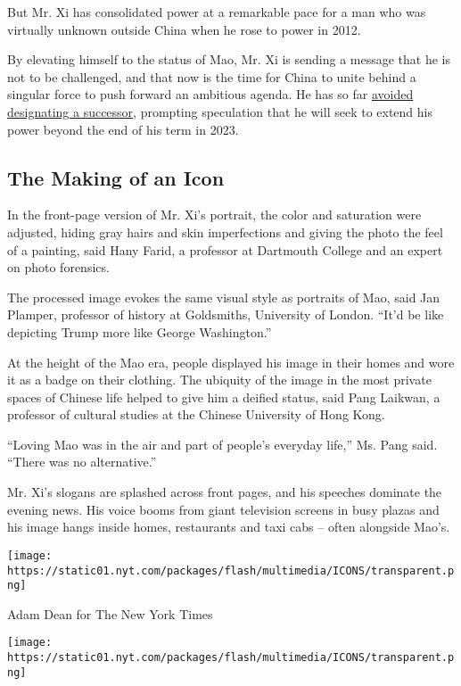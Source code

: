 But Mr. Xi has consolidated power at a remarkable pace for a man who was
virtually unknown outside China when he rose to power in 2012.

By elevating himself to the status of Mao, Mr. Xi is sending a message
that he is not to be challenged, and that now is the time for China to
unite behind a singular force to push forward an ambitious agenda. He
has so far
\href{https://www.nytimes.com/2017/10/24/world/asia/xi-jinping-china.html}{avoided
designating a successor}, prompting speculation that he will seek to
extend his power beyond the end of his term in 2023.

\hypertarget{the-making-of-an-icon}{%
\subsection{The Making of an Icon}\label{the-making-of-an-icon}}

In the front-page version of Mr. Xi's portrait, the color and saturation
were adjusted, hiding gray hairs and skin imperfections and giving the
photo the feel of a painting, said Hany Farid, a professor at Dartmouth
College and an expert on photo forensics.

The processed image evokes the same visual style as portraits of Mao,
said Jan Plamper, professor of history at Goldsmiths, University of
London. ``It'd be like depicting Trump more like George Washington.''

At the height of the Mao era, people displayed his image in their homes
and wore it as a badge on their clothing. The ubiquity of the image in
the most private spaces of Chinese life helped to give him a deified
status, said Pang Laikwan, a professor of cultural studies at the
Chinese University of Hong Kong.

``Loving Mao was in the air and part of people's everyday life,'' Ms.
Pang said. ``There was no alternative.''

Mr. Xi's slogans are splashed across front pages, and his speeches
dominate the evening news. His voice booms from giant television screens
in busy plazas and his image hangs inside homes, restaurants and taxi
cabs -- often alongside Mao's.

\texttt{[image: https://static01.nyt.com/packages/flash/multimedia/ICONS/transparent.png]}

Adam Dean for The New York Times

\texttt{[image: https://static01.nyt.com/packages/flash/multimedia/ICONS/transparent.png]}

